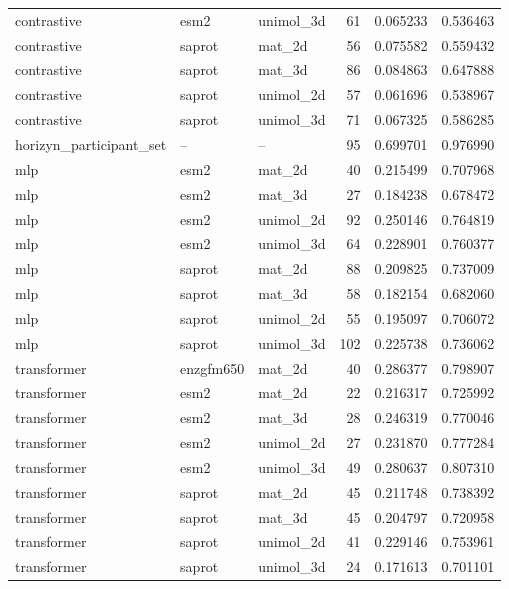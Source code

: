 \begin{longtable}{p{.32\linewidth}llrrr}
contrastive & esm2 & unimol\_3d & 61 & 0.065233 & 0.536463 \\
contrastive & saprot & mat\_2d & 56 & 0.075582 & 0.559432 \\
contrastive & saprot & mat\_3d & 86 & 0.084863 & 0.647888 \\
contrastive & saprot & unimol\_2d & 57 & 0.061696 & 0.538967 \\
contrastive & saprot & unimol\_3d & 71 & 0.067325 & 0.586285 \\
horizyn\_participant\_set & -- & -- & 95 & 0.699701 & 0.976990 \\
mlp & esm2 & mat\_2d & 40 & 0.215499 & 0.707968 \\
mlp & esm2 & mat\_3d & 27 & 0.184238 & 0.678472 \\
mlp & esm2 & unimol\_2d & 92 & 0.250146 & 0.764819 \\
mlp & esm2 & unimol\_3d & 64 & 0.228901 & 0.760377 \\
mlp & saprot & mat\_2d & 88 & 0.209825 & 0.737009 \\
mlp & saprot & mat\_3d & 58 & 0.182154 & 0.682060 \\
mlp & saprot & unimol\_2d & 55 & 0.195097 & 0.706072 \\
mlp & saprot & unimol\_3d & 102 & 0.225738 & 0.736062 \\
transformer & enzgfm650 & mat\_2d & 40 & 0.286377 & 0.798907 \\
transformer & esm2 & mat\_2d & 22 & 0.216317 & 0.725992 \\
transformer & esm2 & mat\_3d & 28 & 0.246319 & 0.770046 \\
transformer & esm2 & unimol\_2d & 27 & 0.231870 & 0.777284 \\
transformer & esm2 & unimol\_3d & 49 & 0.280637 & 0.807310 \\
transformer & saprot & mat\_2d & 45 & 0.211748 & 0.738392 \\
transformer & saprot & mat\_3d & 45 & 0.204797 & 0.720958 \\
transformer & saprot & unimol\_2d & 41 & 0.229146 & 0.753961 \\
transformer & saprot & unimol\_3d & 24 & 0.171613 & 0.701101 \\
\end{longtable}
